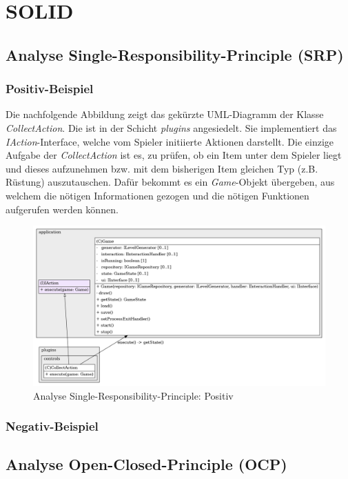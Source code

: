 \chapter{SOLID}

\section{Analyse Single-Responsibility-Principle (SRP)}
\subsection{Positiv-Beispiel}
Die nachfolgende Abbildung zeigt das gekürzte UML-Diagramm der Klasse
\textit{CollectAction}. Die ist in der Schicht \textit{plugins}
angesiedelt. Sie implementiert das \textit{IAction}-Interface, welche
vom Spieler initiierte Aktionen darstellt. Die einzige Aufgabe der
\textit{CollectAction} ist es, zu prüfen, ob ein Item unter dem 
Spieler liegt und dieses aufzunehmen bzw. mit dem bisherigen Item
gleichen Typ (z.B. Rüstung) auszutauschen. Dafür bekommt es ein
\textit{Game}-Objekt übergeben, aus welchem die nötigen Informationen
gezogen und die nötigen Funktionen aufgerufen werden können.

\vspace{0.5cm}
\begin{figure}[H]
    \centering
    \includegraphics[width=1\linewidth]{Bilder/Visualisierung/CollectActionSimplified_structure.png}
    \caption{Analyse Single-Responsibility-Principle: Positiv}
\end{figure}

\subsection{Negativ-Beispiel}

\section{Analyse Open-Closed-Principle (OCP)}
